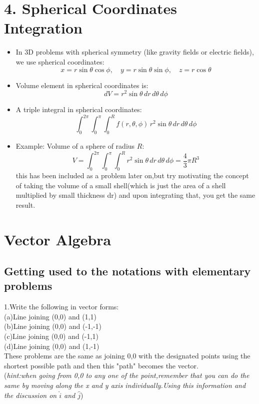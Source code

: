 \documentclass[12pt]{article}
\begin{document}
\section*{4. Spherical Coordinates Integration}
\begin{itemize}
    \item In 3D problems with spherical symmetry (like gravity fields or electric fields), we use spherical coordinates:
    \[
    x = r \sin\theta \cos\phi, \quad y = r \sin\theta \sin\phi, \quad z = r \cos\theta
    \]
    \item Volume element in spherical coordinates is:
    \[
    dV = r^2 \sin\theta \, dr \, d\theta \, d\phi
    \]
    \item A triple integral in spherical coordinates:
    \[
    \int_{0}^{2\pi} \int_{0}^{\pi} \int_{0}^{R} f(r, \theta, \phi) \, r^2 \sin\theta \, dr \, d\theta \, d\phi
    \]
    \item Example: Volume of a sphere of radius \( R \):
    \[
    V = \int_{0}^{2\pi} \int_{0}^{\pi} \int_{0}^{R} r^2 \sin\theta \, dr \, d\theta \, d\phi = \frac{4}{3}\pi R^3
    \]
    this has been included as a problem later on,but try motivating the concept of taking the volume of a small shell(which is just the area of a shell multiplied by small thickness dr) and upon integrating that, you get the same result.
\end{itemize}











\section*{Vector Algebra}
\subsection{Getting used to the notations with elementary problems}
1.Write the following in vector forms:\\
(a)Line joining (0,0) and (1,1)\\
(b)Line joining (0,0) and (-1,-1)\\
(c)Line joining (0,0) and (-1,1)\\
(d)Line joining (0,0) and (1,-1)\\
These problems are the same as joining 0,0 with the designated points using the shortest possible path and then this "path" becomes the vector.\\
(\textit{hint:when going from 0,0 to any one of the point,remember that you can do the same by moving along the x and y axis individually.Using this information and the discussion on $\hat{i}$ and $\hat{j}$})\\
\end{document}
